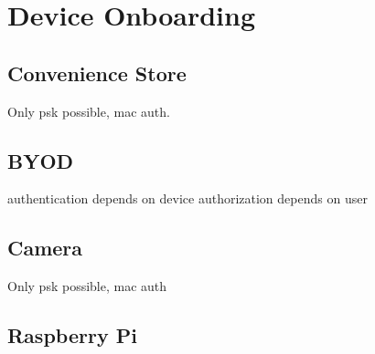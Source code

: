 \chapter{Device Onboarding}

\section{Convenience Store}
Only psk possible, mac auth.
\section{BYOD}
authentication depends on device
authorization depends on user
\section{Camera}
Only psk possible, mac auth
\section{Raspberry Pi}
